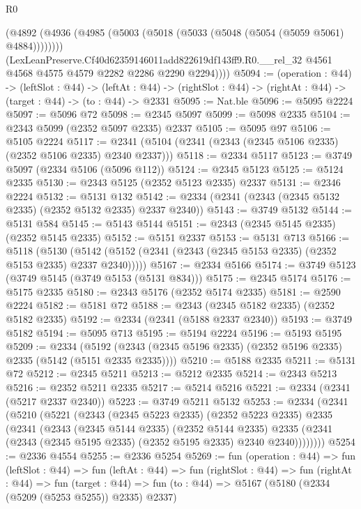 \begin{lexlean}{R0}
\begin{coremodule}
          (@4892 (@4936 (@4985 (@5003 (@5018 (@5033 (@5048 (@5054 (@5059 @5061) @4884))))))))
          (LexLeanPreserve.Cf40d62359146011add822619df143ff9.R0.__rel_32
            @4561
            @4568
            @4575
            @4579
            @2282
            @2286
            @2290
            @2294))))
@5094 := (operation : @44) ->
  (leftSlot : @44) ->
  (leftAt : @44) -> (rightSlot : @44) -> (rightAt : @44) -> (target : @44) -> (to : @44) -> @2331
@5095 := Nat.ble
@5096 := @5095 @2224
@5097 := @5096 @72
@5098 := @2345 @5097
@5099 := @5098 @2335
@5104 := @2343 @5099 (@2352 @5097 @2335) @2337
@5105 := @5095 @97
@5106 := @5105 @2224
@5117 := @2341 (@5104 (@2341 (@2343 (@2345 @5106 @2335) (@2352 @5106 @2335) @2340 @2337)))
@5118 := @2334 @5117
@5123 := @3749 @5097 (@2334 @5106 (@5096 @112))
@5124 := @2345 @5123
@5125 := @5124 @2335
@5130 := @2343 @5125 (@2352 @5123 @2335) @2337
@5131 := @2346 @2224
@5132 := @5131 @132
@5142 := @2334 (@2341 (@2343 (@2345 @5132 @2335) (@2352 @5132 @2335) @2337 @2340))
@5143 := @3749 @5132
@5144 := @5131 @584
@5145 := @5143 @5144
@5151 := @2343 (@2345 @5145 @2335) (@2352 @5145 @2335)
@5152 := @5151 @2337
@5153 := @5131 @713
@5166 := @5118
    (@5130 (@5142 (@5152 (@2341 (@2343 (@2345 @5153 @2335) (@2352 @5153 @2335) @2337 @2340)))))
@5167 := @2334 @5166
@5174 := @3749 @5123 (@3749 @5145 (@3749 @5153 (@5131 @834)))
@5175 := @2345 @5174
@5176 := @5175 @2335
@5180 := @2343 @5176 (@2352 @5174 @2335)
@5181 := @2590 @2224
@5182 := @5181 @72
@5188 := @2343 (@2345 @5182 @2335) (@2352 @5182 @2335)
@5192 := @2334 (@2341 (@5188 @2337 @2340))
@5193 := @3749 @5182
@5194 := @5095 @713
@5195 := @5194 @2224
@5196 := @5193 @5195
@5209 := @2334
    (@5192 (@2343 (@2345 @5196 @2335) (@2352 @5196 @2335) @2335 (@5142 (@5151 @2335 @2335))))
@5210 := @5188 @2335
@5211 := @5131 @72
@5212 := @2345 @5211
@5213 := @5212 @2335
@5214 := @2343 @5213
@5216 := @2352 @5211 @2335
@5217 := @5214 @5216
@5221 := @2334 (@2341 (@5217 @2337 @2340))
@5223 := @3749 @5211 @5132
@5253 := @2334
    (@2341
      (@5210
        (@5221
          (@2343
            (@2345 @5223 @2335)
            (@2352 @5223 @2335)
            @2335
            (@2341
              (@2343
                (@2345 @5144 @2335)
                (@2352 @5144 @2335)
                @2335
                (@2341 (@2343 (@2345 @5195 @2335) (@2352 @5195 @2335) @2340 @2340))))))))
@5254 := @2336 @4554
@5255 := @2336 @5254
@5269 := fun (operation : @44) =>
  fun (leftSlot : @44) =>
  fun (leftAt : @44) =>
  fun (rightSlot : @44) =>
  fun (rightAt : @44) =>
  fun (target : @44) => fun (to : @44) => @5167 (@5180 (@2334 (@5209 (@5253 @5255)) @2335) @2337)

\end{coremodule}
\end{lexlean}
